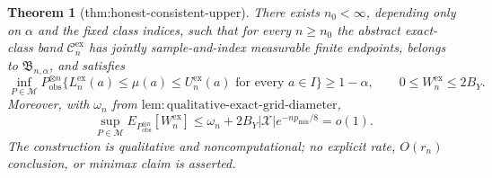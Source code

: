 \documentclass{article}
\newtheorem{theorem}{Theorem}
\begin{document}
\begin{theorem}[thm:honest-consistent-upper]\label{thm:honest-consistent-upper}
There exists \(n_0<\infty\), depending only on \(\alpha\) and the fixed class
indices, such that for every \(n\ge n_0\) the abstract exact-class band
\(\mathcal C_n^{\mathrm{ex}}\) has jointly sample-and-index measurable finite
endpoints, belongs to \(\mathfrak B_{n,\alpha}\), and satisfies
\[
 \inf_{P\in\mathcal M}P_{\mathrm{obs}}^{\otimes n}
 \{L_n^{\mathrm{ex}}(a)\le\mu(a)\le U_n^{\mathrm{ex}}(a)
 \text{ for every }a\in I\}\ge1-\alpha,
 \qquad 0\le W_n^{\mathrm{ex}}\le2B_Y.
\]
Moreover, with \(\omega_n\) from
\(\mathrm{lem{:}qualitative\text{-}exact\text{-}grid\text{-}diameter}\),
\[
 \sup_{P\in\mathcal M}
 E_{P_{\mathrm{obs}}^{\otimes n}}[W_n^{\mathrm{ex}}]
 \le \omega_n+2B_Y|\mathcal X|e^{-np_{\min}/8}=o(1).
\]
The construction is qualitative and noncomputational; no explicit rate,
\(O(r_n)\) conclusion, or minimax claim is asserted.
\end{theorem}
\end{document}
